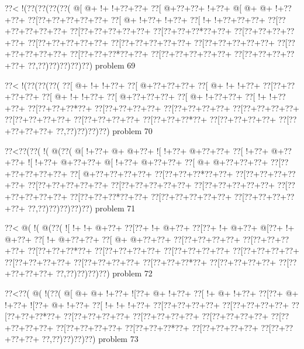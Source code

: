 \vbox{\vbox{\goo
\0??<\- !(\0??(\0??(\0??(\0??(
\- @[\- @+\- !+\- !+\0??+\0??+
\0??[\- @+\0??+\0??+\- !+\0??+
\- @[\- @+\- @+\- !+\0??+\0??+
\0??[\0??+\0??+\0??+\0??+\0??+
\0??[\- @+\- !+\0??+\- !+\0??+
\0??[\- !+\- !+\0??+\0??+\0??+
\0??[\0??+\0??+\0??+\0??+\0??+
\0??[\0??+\0??+\0??+\0??+\0??+
\0??[\0??+\0??+\0??*\0??+\0??+
\0??[\0??+\0??+\0??+\0??+\0??+
\0??[\0??+\0??+\0??+\0??+\0??+
\0??[\0??+\0??+\0??+\0??+\0??+
\0??[\0??+\0??+\0??+\0??+\0??+
\0??[\0??+\0??+\0??+\0??+\0??+
\0??[\0??+\0??+\0??*\0??+\0??+
\0??[\0??+\0??+\0??+\0??+\0??+
\0??[\0??+\0??+\0??+\0??+\0??+
\0??,\0??)\0??)\0??)\0??)\0??)
}
\hfil problem 69\hfil\break
}

\vbox{\vbox{\goo
\0??<\- !(\0??(\0??(\0??(
\0??[\- @+\- !+\- !+\0??+
\0??[\- @+\0??+\0??+\0??+
\0??[\- @+\- !+\- !+\0??+
\0??[\0??+\0??+\0??+\0??+
\0??[\- @+\- !+\- !+\0??+
\0??[\- @+\0??+\0??+\0??+
\0??[\- @+\- !+\0??+\0??+
\0??[\- !+\- !+\0??+\0??+
\0??[\0??+\0??+\0??*\0??+
\0??[\0??+\0??+\0??+\0??+
\0??[\0??+\0??+\0??+\0??+
\0??[\0??+\0??+\0??+\0??+
\0??[\0??+\0??+\0??+\0??+
\0??[\0??+\0??+\0??+\0??+
\0??[\0??+\0??+\0??*\0??+
\0??[\0??+\0??+\0??+\0??+
\0??[\0??+\0??+\0??+\0??+
\0??,\0??)\0??)\0??)\0??)
}
\hfil problem 70\hfil\break
}

\vbox{\vbox{\goo
\0??<\0??(\0??(\- !(\- @(\0??(
\- @[\- !+\0??+\- @+\- @+\0??+
\- ![\- !+\0??+\- @+\0??+\0??+
\0??[\- !+\0??+\- @+\0??+\0??+
\- ![\- !+\0??+\- @+\0??+\0??+
\- @[\- !+\0??+\- @+\0??+\0??+
\0??[\- @+\- @+\0??+\0??+\0??+
\0??[\0??+\0??+\0??+\0??+\0??+
\0??[\- @+\0??+\0??+\0??+\0??+
\0??[\0??+\0??+\0??*\0??+\0??+
\0??[\0??+\0??+\0??+\0??+\0??+
\0??[\0??+\0??+\0??+\0??+\0??+
\0??[\0??+\0??+\0??+\0??+\0??+
\0??[\0??+\0??+\0??+\0??+\0??+
\0??[\0??+\0??+\0??+\0??+\0??+
\0??[\0??+\0??+\0??*\0??+\0??+
\0??[\0??+\0??+\0??+\0??+\0??+
\0??[\0??+\0??+\0??+\0??+\0??+
\0??,\0??)\0??)\0??)\0??)\0??)
}
\hfil problem 71\hfil\break
}

\vbox{\vbox{\goo
\0??<\- @(\- !(\- @(\0??(
\- ![\- !+\- !+\- @+\0??+
\0??[\0??+\- !+\- @+\0??+
\0??[\0??+\- !+\- @+\0??+
\- @[\0??+\- !+\- @+\0??+
\0??[\- !+\- @+\0??+\0??+
\0??[\- @+\- @+\0??+\0??+
\0??[\0??+\0??+\0??+\0??+
\0??[\0??+\0??+\0??+\0??+
\0??[\0??+\0??+\0??*\0??+
\0??[\0??+\0??+\0??+\0??+
\0??[\0??+\0??+\0??+\0??+
\0??[\0??+\0??+\0??+\0??+
\0??[\0??+\0??+\0??+\0??+
\0??[\0??+\0??+\0??+\0??+
\0??[\0??+\0??+\0??*\0??+
\0??[\0??+\0??+\0??+\0??+
\0??[\0??+\0??+\0??+\0??+
\0??,\0??)\0??)\0??)\0??)
}
\hfil problem 72\hfil\break
}

\vbox{\vbox{\goo
\0??<\0??(\- @(\- !(\0??(
\- @[\- @+\- @+\- !+\0??+
\- ![\0??+\- @+\- !+\0??+
\0??[\- !+\- @+\- !+\0??+
\0??[\0??+\- @+\- !+\0??+
\- ![\0??+\- @+\- !+\0??+
\0??[\- !+\- !+\- !+\0??+
\0??[\0??+\0??+\0??+\0??+
\0??[\0??+\0??+\0??+\0??+
\0??[\0??+\0??+\0??*\0??+
\0??[\0??+\0??+\0??+\0??+
\0??[\0??+\0??+\0??+\0??+
\0??[\0??+\0??+\0??+\0??+
\0??[\0??+\0??+\0??+\0??+
\0??[\0??+\0??+\0??+\0??+
\0??[\0??+\0??+\0??*\0??+
\0??[\0??+\0??+\0??+\0??+
\0??[\0??+\0??+\0??+\0??+
\0??,\0??)\0??)\0??)\0??)
}
\hfil problem 73\hfil\break
}

